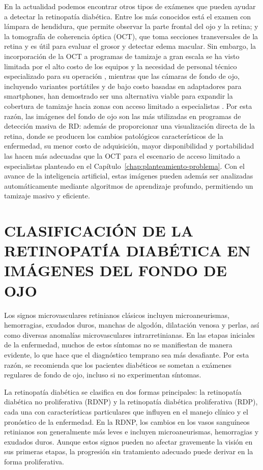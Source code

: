 En la actualidad podemos encontrar otros tipos de exámenes que pueden ayudar a detectar
la retinopatía diabética. Entre los más conocidos está el examen con lámpara de
hendidura, que permite observar la parte frontal del ojo y la retina; y la tomografía de
coherencia óptica (OCT), que toma secciones transversales de la retina y es útil para
evaluar el grosor y detectar edema macular. Sin embargo, la incorporación de la OCT a
programas de tamizaje a gran escala se ha visto limitada por el alto costo de los
equipos y la necesidad de personal técnico especializado para su operación
, mientras que las cámaras de fondo de ojo, incluyendo
variantes portátiles y de bajo costo basadas en adaptadores para smartphones, han
demostrado ser una alternativa viable para expandir la cobertura de tamizaje hacia
zonas con acceso limitado a especialistas . Por esta
razón, las imágenes del fondo de ojo son las más utilizadas en programas de detección
masiva de RD: además de proporcionar una visualización directa de la retina, donde se
producen los cambios patológicos característicos de la enfermedad, su menor costo de
adquisición, mayor disponibilidad y portabilidad las hacen más adecuadas que la OCT
para el escenario de acceso limitado a especialistas planteado en el
Capítulo~\ref{chap:planteamiento-problema}. Con el avance de la inteligencia
artificial, estas imágenes pueden además ser analizadas automáticamente mediante
algoritmos de aprendizaje profundo, permitiendo un tamizaje masivo y eficiente.

\section{CLASIFICACIÓN DE LA RETINOPATÍA DIABÉTICA EN IMÁGENES DEL FONDO DE OJO}

Los signos microvasculares retinianos clásicos incluyen microaneurismas, hemorragias,
exudados duros, manchas de algodón, dilatación venosa y perlas, así como diversas
anomalías microvasculares intrarretinianas. En las etapas iniciales de la enfermedad,
muchos de estos síntomas no se manifiestan de manera evidente, lo que hace que el
diagnóstico temprano sea más desafiante. Por esta razón, se recomienda que los pacientes
diabéticos se sometan a exámenes regulares de fondo de ojo, incluso si no experimentan
síntomas.

La retinopatía diabética se clasifica en dos formas principales: la retinopatía diabética
no proliferativa (RDNP) y la retinopatía diabética proliferativa (RDP), cada una con
características particulares que influyen en el manejo clínico y el pronóstico de la
enfermedad. En la RDNP, los cambios en los vasos sanguíneos retinianos son generalmente
más leves e incluyen microaneurismas, hemorragias y exudados duros. Aunque estos signos
pueden no afectar gravemente la visión en sus primeras etapas, la progresión sin
tratamiento adecuado puede derivar en la forma proliferativa.


